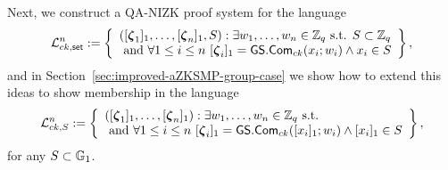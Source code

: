 Next, we construct a QA-NIZK proof system for the language
$$
\Lang_{ck,\mathsf{set}}^n:=\left\{\begin{array}{l}
([\grkb{\zeta}_1]_1,\ldots,[\grkb{\zeta}_n]_1,S):\exists w_1,\ldots,w_n\in\Z_q \text{ s.t. } S\subset\Z_q\\
\text{ and } \forall 1\leq i\leq n\ [\grkb{\zeta}_i]_1=\GS.\Com_{ck}(x_i;w_i)\wedge x_i\in S
\end{array}\right\},
$$
and in Section~\ref{sec:improved-aZKSMP-group-case} we show how to extend this ideas to show membership in the language
$$
\Lang_{ck,S}^n:=\left\{\begin{array}{l}
([\grkb{\zeta}_1]_1,\ldots,[\grkb{\zeta}_n]_1):\exists w_1,\ldots,w_n\in\Z_q \text{ s.t. } \\
\text{ and } \forall 1\leq i\leq n\ [\grkb{\zeta}_i]_1=\GS.\Com_{ck}([x_i]_1;w_i)\wedge [x_i]_1\in S
\end{array}\right\},
$$
for any $S\subset\mathbb{G}_1$.

